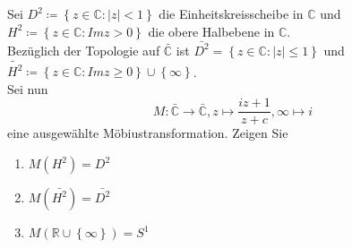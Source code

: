 \begin{assignment}
 Sei $D^2 \coloneqq \left\{ z \in \mathbb{C} : \vert z \vert < 1 \right\}$ die Einheitskreisscheibe in $\mathbb{C}$ und $H^2 \coloneqq \left\{ z \in \mathbb{C} : Im z > 0 \right\}$ die obere Halbebene in $\mathbb{C}$. \\
 Bezüglich der Topologie auf $\bar{\mathbb{C}} $ ist $\bar{ D^2 } = \left\{ z \in \mathbb{C} : \vert z \vert \leq 1 \right\}$ und $\tilde{H^2} \coloneqq \left\{ z \in \mathbb{C} : Im z \geq 0 \right\} \cup \left\{ \infty \right\}$.\\
 Sei nun
 \begin{equation*}
    M: \bar{\mathbb{C}} \to \bar{\mathbb{C}}, z \mapsto \frac{iz + 1}{z + c}, \infty \mapsto i
 \end{equation*}
 eine ausgewählte Möbiustransformation. Zeigen Sie
 \begin{enumerate}[label=(\alph*)] 
  \item $M(H^2) = D^2$
  \item $M(\bar{ H^2 }) = \bar{ D^2 }$
  \item $M(\mathbb{R} \cup \left\{ \infty \right\}) = S^1$

 \end{enumerate}
\end{assignment}
